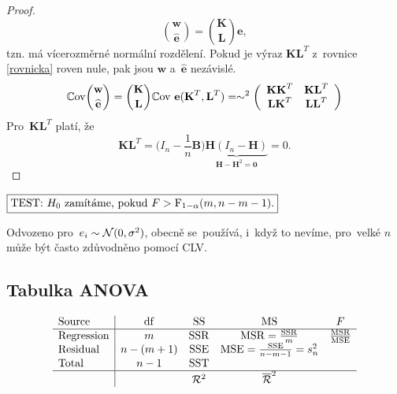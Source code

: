 \begin{proof}
 $$ \binom{\textbf{w}}{\widehat{\textbf{e}}} = \binom{\textbf{K}}{\textbf{L}} \textbf{e}, $$
 tzn. má vícerozměrné normální rozdělení. Pokud je výraz $\textbf{K}\textbf{L}^T$ z~rovnice \ref{rovnicka} roven nule, pak jsou $\textbf{w}$ a~$\widehat{\textbf{e}}$ nezávislé.
  \begin{equation}\label{rovnicka}
  \Cov\binom{\textbf{w}}{\widehat{\textbf{e}}} = \binom{\textbf{K}}{\textbf{L}}\Cov~\textbf{e}(\textbf{K}^T,\textbf{L}^T) = \sim^2 \left(\begin{array}{cc}
  \textbf{K}\textbf{K}^T&\textbf{K}\textbf{L}^T  \\
  \textbf{L}\textbf{K}^T & \textbf{L}\textbf{L}^T
  \end{array}
  \right)
  \end{equation}
  Pro~$\textbf{K}\textbf{L}^T$ platí, že
 $$ \textbf{K}\textbf{L}^T = \big(I_n-\frac{1}{n}\textbf{B} \big)\underbrace{\textbf{H}(I_n-\textbf{H})}_{\textbf{H}-\textbf{H}^2 = \textbf{0}} = 0. $$
\end{proof}

 $\test{F>\FF_{1-\alpha}(m,n-m-1)}$

 \begin{remark}
 	Odvozeno pro~$e_i\sim\NN(0,\sigma^2)$, obecně se~používá, i~když to nevíme, pro~velké $n$ může být často zdůvodněno pomocí CLV.
 \end{remark}
\subsection*{Tabulka ANOVA}
 $$ \begin{array}{l|cccc}
\text{Source}& \mathrm{df} & \mathrm{SS} & \mathrm{MS} & F \\\hline
\text{Regression} & m & \SSR & \MSR = \frac{\SSR}{m} & \frac{\MSR}{\MSE} \\
\text{Residual} & n-(m+1) & \SSE & \MSE = \frac{\SSE}{n-m-1} = s_n^2 &  \\
\text{Total} & n-1 & \SST &  &  \\\hline
&  & \RR^2 & \overline{\RR}^2 &
\end{array}
 $$
